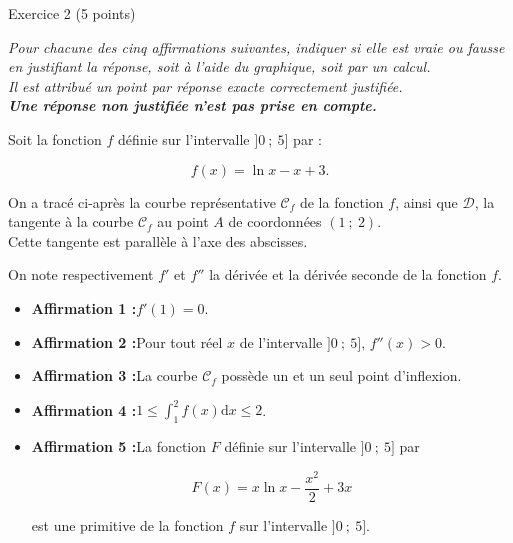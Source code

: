 
%
\begin{h2}Exercice 2 (5 points)\end{h2}
\par
\emph{Pour chacune des cinq affirmations suivantes, indiquer si elle est vraie ou fausse en justifiant la réponse, soit à l'aide du graphique, soit par un calcul.\\ Il est attribué un point par réponse exacte correctement justifiée.\\ \textbf{Une réponse non justifiée n'est pas prise en compte.}}
\par
Soit la fonction $f$ définie sur l'intervalle $]0~;~5]$ par :
\par
\[f(x) =  \ln x - x + 3.  \]
\par
On a tracé ci-après la courbe représentative $\mathscr{C}_f$ de la fonction $f$, ainsi que $\mathscr{D}$, la tangente à la courbe $\mathscr{C}_f$ au point $A$ de coordonnées $(1~;~2)$.\\ Cette tangente est parallèle à l'axe des abscisses.
\par
On note respectivement $f'$ et $f''$ la dérivée et la dérivée seconde de la fonction $f$.
\par
\begin{center}
\end{center}
\par
\begin{itemize}
     \item %
     \textbf{Affirmation 1 :}\quad $f'(1)=0$.
     \item %
     \textbf{Affirmation 2 :}\quad Pour tout réel $x$ de l'intervalle $]0~;~5]$, $f''(x)>0$.
     \item %
     \textbf{Affirmation 3 :}\quad La courbe $\mathscr{C}_f$ possède un et un seul point d'inflexion.
     \item %
     \textbf{Affirmation 4 :}\quad $1 \leqslant \displaystyle\int_{1}^{2}f(x)\text{d}x \leqslant 2$.
     \item %
     \textbf{Affirmation 5 :}\quad La fonction $F$ définie sur l'intervalle $]0~;~5]$ par
     \par
     \[F(x) =  x\ln x - \dfrac{x^2}{2} + 3x  \]
     \par
     est une primitive de la fonction $f$ sur l'intervalle $]0~;~5]$.
     \par
\end{itemize}
